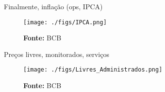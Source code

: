 \documentclass[presentation]{beamer}
\begin{document}
\begin{frame}[label={sec:org96399c4}]{Finalmente, inflação (ops, IPCA)}
\begin{figure}[htb]
\centering
\caption{IPCA e Metas para Inflação} 
\texttt{[image: ./figs/IPCA.png]}
\label{fig:IPCA}
\caption*{\textbf{Fonte:} BCB}
\end{figure}
\end{frame}
\begin{frame}[label={sec:org7e33315}]{Preços livres, monitorados, serviços}
\begin{figure}[htb]
\centering
\caption{IPCA e seus componentes: preços livres, monitorados e serviços} 
\texttt{[image: ./figs/Livres\_Administrados.png]}
\label{fig:livres_adm}
\caption*{\textbf{Fonte:} BCB}
\end{figure}
\end{frame}
\end{document}
